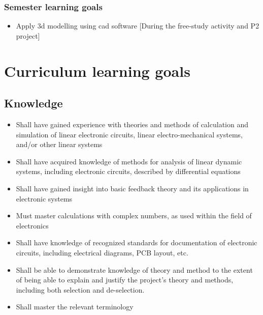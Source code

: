 \subsubsection{Semester learning goals}
\begin{itemize}
	\item Apply 3d modelling using cad software [During the free-study activity and P2 project]
\end{itemize}

\clearpage

\section{Curriculum learning goals}\label{appendix:curriculum-learning-goals}
\subsection{Knowledge}
\begin{itemize}
	\item Shall have gained experience with theories and methods of calculation and simulation of linear electronic circuits, linear electro-mechanical systems, and/or other linear systems
	\item Shall have acquired knowledge of methods for analysis of linear dynamic systems, including electronic circuits, described by differential equations
	\item Shall have gained insight into basic feedback theory and its applications in electronic systems
	\item Must master calculations with complex numbers, as used within the field of electronics
	\item Shall have knowledge of recognized standards for documentation of electronic circuits, including electrical diagrams, PCB layout, etc.
	\item Shall be able to demonstrate knowledge of theory and method to the extent of being able to explain and justify the project's theory and methods, including both selection and de-selection.
	\item Shall master the relevant terminology
\end{itemize}

